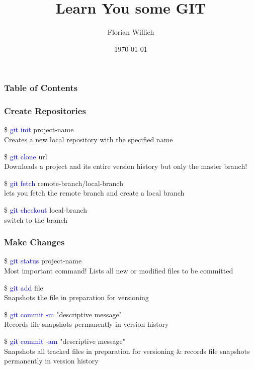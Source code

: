\documentclass[aspectratio=169]{beamer}
\title[Learn You some GIT] %
{Learn You some GIT}
\author[Florian Willich]{Florian Willich}
\institute[BIT]
{
  Quality and Usability Lab\\
  Berlin Institute of Technology
}
\date{\today}
\begin{document}
\frame{\titlepage}

\begin{frame}
\frametitle{Table of Contents}
\tableofcontents[currentsection]
\end{frame}

\begin{frame}
\frametitle{Create Repositories}

\$ \textcolor{blue}{git init} project-name\\
Creates a new local repository with the specified name

\$ \textcolor{blue}{git clone} url\\
Downloads a project and its entire version history but only the master branch!

\$ \textcolor{blue}{git fetch} remote-branch/local-branch\\
lets you fetch the remote branch and create a local branch

\$ \textcolor{blue}{git checkout} local-branch\\
switch to the branch\\

\end{frame}

\begin{frame}
  
\frametitle{Make Changes}

\$ \textcolor{blue}{git status} project-name\\
Most important command! Lists all new or modified files to be committed

\$ \textcolor{blue}{git add} file\\
Snapshots the file in preparation for versioning

\$ \textcolor{blue}{git commit -m} "descriptive message"\\
Records file snapshots permanently in version history

\$ \textcolor{blue}{git commit -am} "descriptive message"\\
Snapshots all tracked files in preparation for versioning \& records file snapshots permanently in version history

\end{frame}
\end{document}
